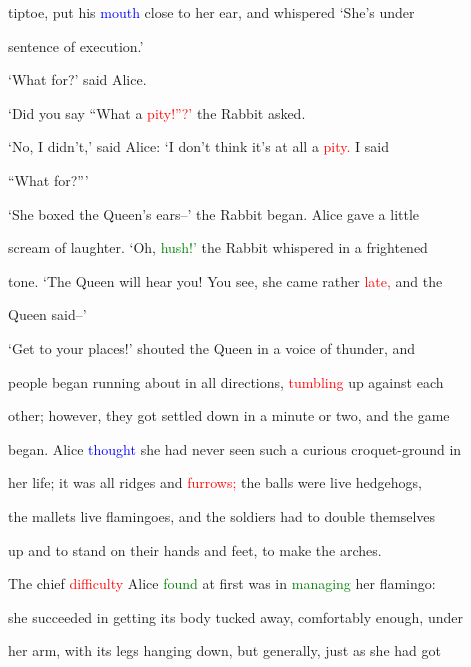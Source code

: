  tiptoe, put his \textcolor{blue}{mouth} close to her ear, and whispered ‘She’s under

 \textcolor{BurntOrange}{sentence} of \textcolor{BurntOrange}{execution.’}



 ‘What for?’ said Alice.



 ‘Did you say “What a \textcolor{red}{pity!”?’} the Rabbit asked.



 ‘No, I didn’t,’ said Alice: ‘I don’t think it’s at all a \textcolor{red}{pity.} I said

 “What for?”’



 ‘She boxed the Queen’s ears--’ the Rabbit began. Alice gave a little

 \textcolor{BurntOrange}{scream} of \textcolor{BurntOrange}{laughter.} ‘Oh, \textcolor{green}{hush!’} the Rabbit whispered in a \textcolor{BurntOrange}{frightened}

 tone. ‘The Queen will hear you! You see, she came rather \textcolor{red}{late,} and the

 Queen said--’



 ‘Get to your places!’ \textcolor{BurntOrange}{shouted} the Queen in a voice of thunder, and

 people began running about in all directions, \textcolor{red}{tumbling} up against each

 other; however, they got settled down in a minute or two, and the game

 began. Alice \textcolor{blue}{thought} she had never seen such a curious croquet-ground in

 her life; it was all ridges and \textcolor{red}{furrows;} the balls were live hedgehogs,

 the mallets live flamingoes, and the \textcolor{BurntOrange}{soldiers} had to double themselves

 up and to stand on their hands and feet, to make the arches.



 The chief \textcolor{red}{difficulty} Alice \textcolor{green}{found} at first was in \textcolor{green}{managing} her flamingo:

 she \textcolor{BurntOrange}{succeeded} in getting its body tucked away, comfortably enough, under

 her arm, with its legs hanging down, but generally, just as she had got

